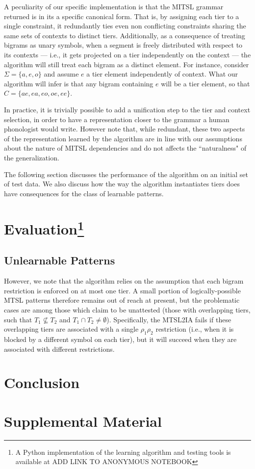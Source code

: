 \documentclass[11pt,a4paper]{article}
\begin{document}
A peculiarity of our specific implementation is that the MITSL grammar returned is in its a specific canonical form.
That is, by assigning each tier to a single constraint,  it redundantly ties even non conflicting constraints sharing the same sets of contexts to distinct tiers.
Additionally, as a consequence of treating bigrams as unary symbols,  when a segment is freely distributed with respect to its contexts --- i.e., it gets projected on a tier independently on the context --- the algorithm will still treat each bigram as a distinct element.
For instance, consider $\Sigma =\{ a, e, o \}$ and assume  $e$ a tier element independently of context.
What our algorithm will infer is that any bigram containing $e$ will be a tier element, so that $C = \{ ae, ea, eo, oe, ee\}$.

In practice, it is trivially possible to add a unification step to the tier and context selection, in order to have a representation closer to the grammar a human phonologist would write.
However note that, while redundant, these two aspects of the representation learned by the algorithm are in line with our assumptions about the nature of MITSL dependencies and do not affects the ``naturalness" of the generalization.

The following section discusses the performance of the algorithm on an initial set of test data.
We also discuss how the way the algorithm instantiates tiers does have consequences for the class of learnable patterns.


\section{Evaluation\footnote{A Python implementation of the learning algorithm and testing tools is available at ADD LINK TO ANONYMOUS NOTEBOOK}}


\subsection{Unlearnable Patterns}
\label{ssec:limits}

However, we note that the algorithm relies on the assumption that each bigram restriction is enforced on at most one tier. A small portion of logically-possible MTSL patterns therefore remains out of reach at present, but the problematic cases are among those which \citet{AksenovaDeshmukh2018} claim to be unattested (those with overlapping tiers, such that $T_1\not\subseteq T_2$ and $T_1\cap T_2\neq\emptyset$). Specifically, the MTSL2IA fails if these overlapping tiers are associated with a single \text{*}$\rho_1\rho_2$ restriction (i.e., when it is blocked by a different symbol on each tier), but it will succeed when they are associated with different restrictions.

\section{Conclusion}





\appendix

\section{Supplemental Material}
\label{sec:supplemental}
\end{document}
